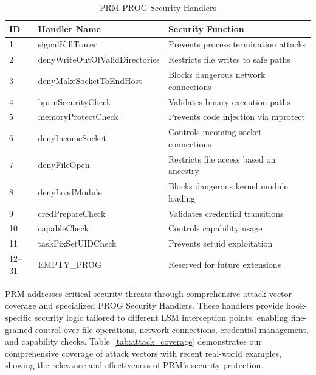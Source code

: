 \documentclass[]{sn-jnl}
\begin{document}
\begin{table}[htbp]
\centering
\caption{PRM PROG Security Handlers}
\label{tab:prog_handlers}
\begin{tabular}{@{}p{1cm}p{5cm}p{4cm}@{}}
\toprule
\textbf{ID} & \textbf{Handler Name} & \textbf{Security Function} \\
\midrule
1     & signalKillTracer              & Prevents process termination attacks \\
2     & denyWriteOutOfValidDirectories & Restricts file writes to safe paths \\
3     & denyMakeSocketToEndHost       & Blocks dangerous network connections \\
4     & bprmSecurityCheck             & Validates binary execution paths \\
5     & memoryProtectCheck            & Prevents code injection via mprotect \\
6     & denyIncomeSocket              & Controls incoming socket connections \\
7     & denyFileOpen                  & Restricts file access based on ancestry \\
8     & denyLoadModule                & Blocks dangerous kernel module loading \\
9     & credPrepareCheck              & Validates credential transitions \\
10    & capableCheck                  & Controls capability usage \\
11    & taskFixSetUIDCheck            & Prevents setuid exploitation \\
12--31 & EMPTY\_PROG                 & Reserved for future extensions \\
\bottomrule
\end{tabular}
\end{table}

PRM addresses critical security threats through comprehensive attack vector
coverage and specialized PROG Security Handlers. These handlers provide
hook-specific security logic tailored to different LSM interception points,
enabling fine-grained control over file operations, network connections,
credential management, and capability checks. Table~\ref{tab:attack_coverage}
demonstrates our comprehensive coverage of attack vectors with recent real-world
examples, showing the relevance and effectiveness of PRM's security protection.
\end{document}
